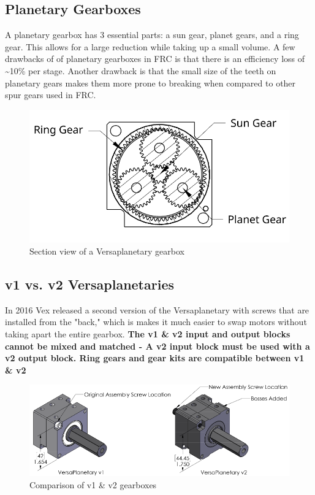 \documentclass[12pt, letterpaper]{article}
\begin{document}
\subsection{Planetary Gearboxes}
A planetary gearbox has 3 essential parts: a sun gear, planet gears, and a ring gear. This allows for a large reduction while taking up a small volume. A few drawbacks of of planetary gearboxes in FRC is that there is an efficiency loss of \~{}10\% per stage. Another drawback is that the small size of the teeth on planetary gears makes them more prone to breaking when compared to other spur gears  used in FRC.

\begin{figure}[h!]
    \centering
    \includegraphics[scale=0.5]{Planetary Gearbox.png}
    \caption{Section view of a Versaplanetary gearbox}
    \label{fig:section view}
\end{figure}

\subsection{v1 vs. v2 Versaplanetaries}
In 2016 Vex released a second version of the Versaplanetary with  screws that are installed from the "back," which is makes  it much easier to swap motors without taking apart the entire gearbox. \textbf{The v1 \& v2 input and output blocks cannot be mixed and matched - A v2 input block must be used with a v2 output block. Ring gears and gear kits are compatible between v1 \& v2}

\begin{figure}[h!]
\centering
\includegraphics[scale = 0.625]{v1v2.png}
\caption{Comparison of v1 \& v2 gearboxes}
\label{fig:v1v2 Comparison}
\end{figure}
\end{document}
